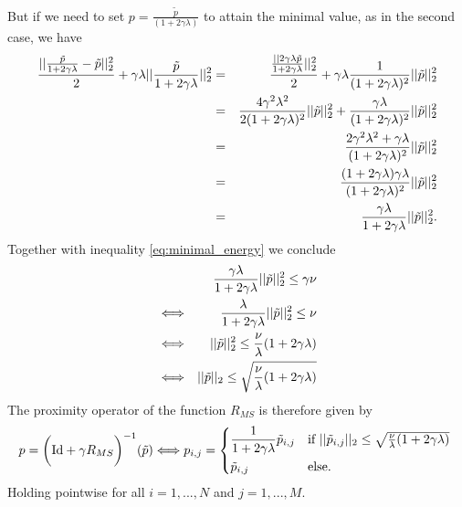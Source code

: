         But if we need to set $p = \frac{\tilde{p}}{(1 + 2\gamma \lambda)}$ to attain the minimal value, as in the second case, we have
            \begin{eqnarray}
                \frac{||\frac{\tilde{p}}{1 + 2\gamma\lambda} - \tilde{p}||_{2}^{2}}{2} + \gamma \lambda ||\frac{\tilde{p}}{1 + 2\gamma\lambda}||_{2}^{2} &=& \frac{\frac{||2\gamma\lambda \tilde{p}}{1 + 2\gamma\lambda}||_{2}^{2}}{2} + \gamma\lambda \frac{1}{(1 + 2\gamma\lambda)^{2}}||\tilde{p}||_{2}^{2} \notag \\
                &=& \frac{4\gamma^{2}\lambda^{2}}{2(1 + 2\gamma\lambda)^{2}} ||\tilde{p}||_{2}^{2} + \frac{\gamma\lambda}{(1 + 2\gamma\lambda)^{2}} ||\tilde{p}||_{2}^{2} \notag \\
                &=& \frac{2\gamma^{2}\lambda^{2} + \gamma\lambda}{(1 + 2\gamma\lambda)^{2}} ||\tilde{p}||_{2}^{2} \notag \\
                &=& \frac{(1 + 2\gamma\lambda)\gamma\lambda}{(1 + 2\gamma\lambda)^{2}} ||\tilde{p}||_{2}^{2} \notag \\
                &=& \frac{\gamma\lambda}{1 + 2\gamma\lambda} ||\tilde{p}||_{2}^{2}. \label{eq:bound_on_p}
            \end{eqnarray}
        Together with inequality \ref{eq:minimal_energy} we conclude
            \begin{eqnarray}
                && \frac{\gamma\lambda}{1 + 2\gamma\lambda} ||\tilde{p}||_{2}^{2} \le \gamma\nu \notag \\
                &\Longleftrightarrow& \frac{\lambda}{1 + 2\gamma\lambda} ||\tilde{p}||_{2}^{2} \le \nu \notag \\
                &\Longleftrightarrow& ||\tilde{p}||_{2}^{2} \le \frac{\nu}{\lambda}(1 + 2\gamma\lambda) \notag \\
                &\Longleftrightarrow& ||\tilde{p}||_{2} \le \sqrt{\frac{\nu}{\lambda}(1 + 2\gamma\lambda)} \label{eq:constraint_R}
            \end{eqnarray}
        The proximity operator of the function $R_{MS}$ is therefore given by
            \begin{equation}
                p = \bigg( \textnormal{Id} + \gamma R_{MS} \bigg)^{-1}(\tilde{p}) \Longleftrightarrow p_{i,j} =
                \begin{dcases*}
                    \frac{1}{1 + 2\gamma\lambda}\tilde{p}_{i,j} & \textnormal{if $||\tilde{p}_{i,j}||_{2} \le \sqrt{\frac{\nu}{\lambda}(1 + 2\gamma\lambda)}$} \\
                    \tilde{p}_{i,j} & \textnormal{else.}
                \end{dcases*}
                \label{eq:proximity_operator_R}
            \end{equation}
        Holding pointwise for all $i = 1, ..., N$ and $j = 1, ..., M$.

